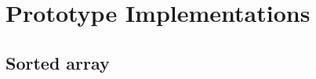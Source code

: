 \documentclass[runningheads]{llncs}
\begin{document}


 

\section{Prototype Implementations}
\subsection{Sorted array}
\end{document}
